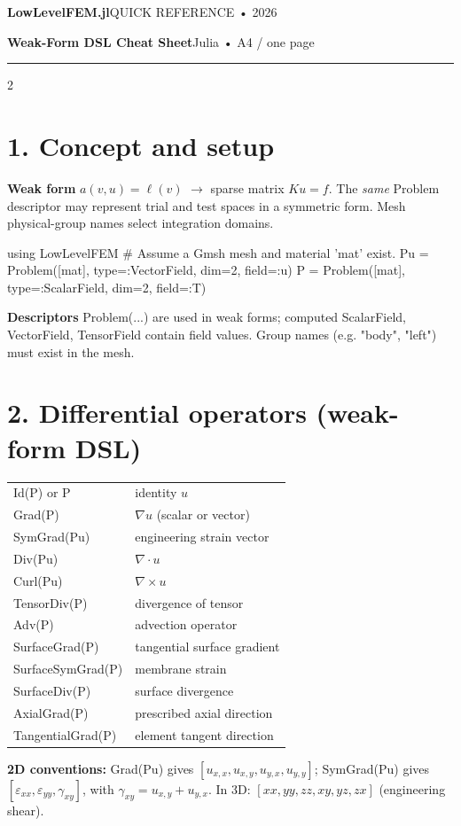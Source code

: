 \documentclass[a4paper,9pt]{extarticle}
\newcommand{\code}[1]{{\ttfamily\small #1}}
\begin{document}
{\color{blue}\fontsize{17}{19}\selectfont\bfseries LowLevelFEM.jl}\hfill {\color{gray}\small QUICK REFERENCE • 2026}\par
{\large\bfseries Weak-Form DSL Cheat Sheet}\hfill\small Julia • A4 / one page\par
\vspace{1mm}\hrule\vspace{2mm}
\begin{multicols}{2}
\section{1. Concept and setup}
\textbf{Weak form} $a(v,u)=\ell(v)$ $\longrightarrow$ sparse matrix $Ku=f$. The \emph{same} \code{Problem} descriptor may represent trial and test spaces in a symmetric form. Mesh physical-group names select integration domains.
\begin{julia}
using LowLevelFEM
# Assume a Gmsh mesh and material 'mat' exist.
Pu = Problem([mat], type=:VectorField,
             dim=2, field=:u)
P  = Problem([mat], type=:ScalarField,
             dim=2, field=:T)
\end{julia}
\textbf{Descriptors} \code{Problem(...)} are used in weak forms; computed \code{ScalarField}, \code{VectorField}, \code{TensorField} contain field values. Group names (e.g. \code{"body"}, \code{"left"}) must exist in the mesh.
\section{2. Differential operators (weak-form DSL)}
\begin{tabular}{@{}ll@{}}
\code{Id(P)} or \code{P} & identity $u$\\
\code{Grad(P)} & $\nabla u$ (scalar or vector)\\
\code{SymGrad(Pu)} & engineering strain vector\\
\code{Div(Pu)} & $\nabla\!\cdot u$\\
\code{Curl(Pu)} & $\nabla\!\times u$\\
\code{TensorDiv(P)} & divergence of tensor\\
\code{Adv(P)} & advection operator\\
\code{SurfaceGrad(P)} & tangential surface gradient\\
\code{SurfaceSymGrad(P)} & membrane strain\\
\code{SurfaceDiv(P)} & surface divergence\\
\code{AxialGrad(P)} & prescribed axial direction\\
\code{TangentialGrad(P)} & element tangent direction
\end{tabular}
\textbf{2D conventions:} \code{Grad(Pu)} gives $[u_{x,x},u_{x,y},u_{y,x},u_{y,y}]$; \code{SymGrad(Pu)} gives $[\varepsilon_{xx},\varepsilon_{yy},\gamma_{xy}]$, with $\gamma_{xy}=u_{x,y}+u_{y,x}$. In 3D: $[xx,yy,zz,xy,yz,zx]$ (engineering shear).

\end{multicols}
\end{document}
